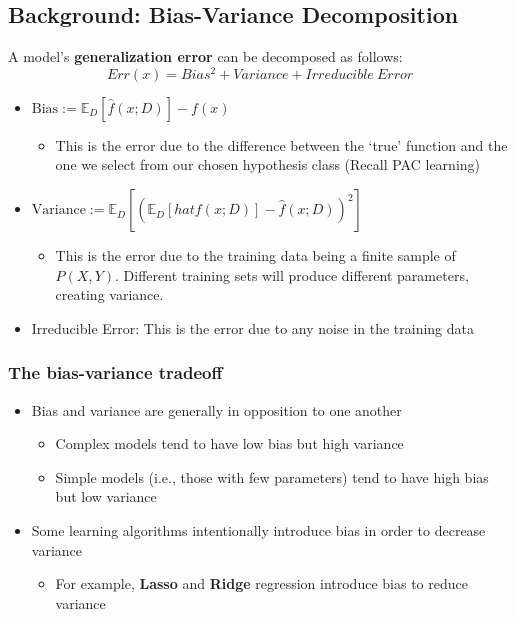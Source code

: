 \documentclass[10pt]{article}
\begin{document}
\subsection*{Background: Bias-Variance Decomposition}
A model's \textbf{generalization error} can be decomposed as follows:
\[Err(x) = Bias^2 + Variance + Irreducible~Error\]
\begin{itemize}
	\item $\text{Bias} := \mathbb{E}_D [\hat{f}(x; D)] - f(x)$
	\begin{itemize}
	    \item This is the error due to the difference between the `true' function and the one we select from our chosen hypothesis class (Recall PAC learning)
    \end{itemize}
    \item $\text{Variance} := \mathbb{E}_D \left[\left(\mathbb{E}_D[hat{f}(x; D)] - \hat{f}(x; D)\right)^2\right]$
    \begin{itemize}
	    \item This is the error due to the training data being a finite sample of $P(X, Y)$.  Different training sets will produce different parameters, creating variance.
    \end{itemize}
    \item Irreducible Error: This is the error due to any noise in the training data
\end{itemize}

\subsubsection*{The bias-variance tradeoff}
\begin{itemize}
	\item Bias and variance are generally in opposition to one another
	\begin{itemize}
	    \item Complex models tend to have low bias but high variance
	    \item Simple models (i.e., those with few parameters) tend to have high bias but low variance
    \end{itemize}
    \item Some learning algorithms intentionally introduce bias in order to decrease variance
    \begin{itemize}
	    \item For example, \textbf{Lasso} and \textbf{Ridge} regression introduce bias to reduce variance
    \end{itemize}   
\end{itemize}
\end{document}

